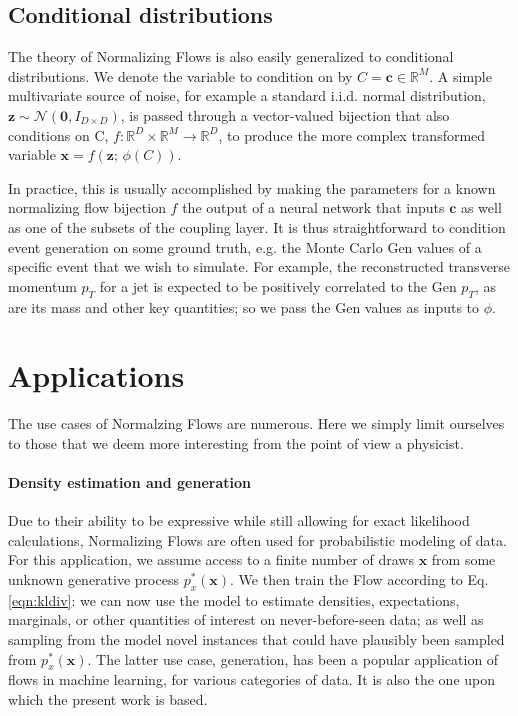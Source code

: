 \subsection{Conditional distributions}

The theory of Normalizing Flows is also easily generalized to conditional distributions. We denote the variable to condition on by $C=\mathbf{c}\in\mathbb{R}^M$. A simple multivariate source of noise, for example a standard i.i.d. normal distribution, $\mathbf{z}\sim\mathcal{N}(\mathbf{0},I_{D\times D})$, is passed through a vector-valued bijection that also conditions on C, $f:\mathbb{R}^D\times\mathbb{R}^M\rightarrow\mathbb{R}^D$, to produce the more complex transformed variable $\mathbf{x}=f(\mathbf{z};\, \phi(C))$. 

In practice, this is usually accomplished by making the parameters for a known normalizing flow bijection $f$ the output of a neural network that inputs $\mathbf{c}$ as well as one of the subsets of the coupling layer. It is thus straightforward to condition event generation on some ground truth, e.g. the Monte Carlo Gen values of a specific event that we wish to simulate. For example, the reconstructed transverse momentum $p_T$ for a jet is expected to be positively correlated to the Gen $p_T$, as are its mass and other key quantities; so we pass the Gen values as inputs to $\phi$.


\section{Applications}\label{sec:nfapp}

The use cases of Normalzing Flows are numerous. 
Here we simply limit ourselves to those that we deem more interesting from the point of view a physicist.

\paragraph{Density estimation and generation}

Due to their ability to be expressive while still allowing for exact likelihood calculations, Normalizing Flows are often used for probabilistic modeling of data. For this application, we assume access to a finite number of draws $\mathbf{x}$ from some unknown generative process $p^*_x(\mathbf{x})$. We then train the Flow according to Eq. \ref{eqn:kldiv}: we can now use the model to estimate densities, expectations, marginals, or other quantities of interest on never-before-seen data; as well as sampling from the model novel instances that could have plausibly been sampled from $p^*_x(\mathbf{x})$. The latter use case, generation, has been a popular application of flows in machine learning, for various categories of data. It is also the one upon which the present work is based.

